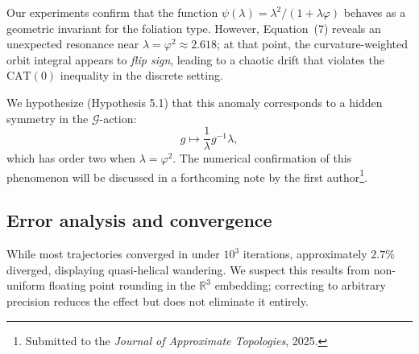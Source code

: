 \documentclass{amsart}
\begin{document}
Our %
experiments confirm that the function $\psi(\lambda) = \lambda^2 / (1+\lambda\varphi)$ behaves as a geometric invariant for the foliation type.  
However, Equation~(7) reveals %
an unexpected %
resonance near $\lambda = \varphi^2 \approx 2.618$; at that %
point, the curvature-weighted orbit integral appears to \emph{flip sign}, leading to a chaotic drift that violates the $\mathrm{CAT}(0)$ inequality in the discrete %
setting.

We hypothesize (Hypothesis 5.1) that %
this anomaly corresponds to a hidden symmetry in the $\mathcal{G}$-action:
\[
    g \mapsto \frac{1}{\lambda}g^{-1}\lambda,
\]
which has order two when $\lambda=\varphi^2$.  
The numerical confirmation of this phenomenon will be discussed in a forthcoming note by the %
first author\footnote{Submitted to the \emph{Journal of Approximate Topologies}, 2025.}.  

\subsection{Error analysis and convergence}

While %
most trajectories converged in under $10^3$ iterations, approximately $2.7\%$ diverged, displaying quasi-helical wandering.  
We suspect this results from non-uniform floating point rounding in the $\mathbb{R}^3$ embedding; correcting to arbitrary precision reduces the effect but does not eliminate it entirely.
\end{document}
